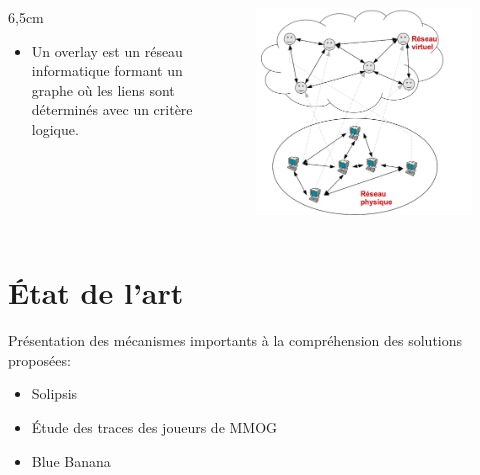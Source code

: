 \documentclass{beamer}
\begin{document}
  \begin{frame}
	
 	\begin{columns}
          \begin{column}{6,5cm}
	    	\begin{itemize}
		\item Un overlay est un réseau informatique formant un graphe où les liens sont déterminés avec un critère logique.\\
		\end{itemize}
	  \end{column}
          \begin{column}{5cm}
        	\begin{figure}
        	  \includegraphics[scale=0.1]{./Ressources/Images/overlay.png}\\
        	  \label{Propa_Algo}
        	\end{figure}
          \end{column}
        \end{columns}
	
  \end{frame}
	
  \section{État de l'art}
  \begin{frame}
	Présentation des  mécanismes importants à la compréhension des solutions proposées:\\
	\begin{itemize}
		\item Solipsis\\
		\item Étude des traces des joueurs de MMOG\\
		\item Blue Banana \\
	\end{itemize}
  \end{frame}
\end{document}
